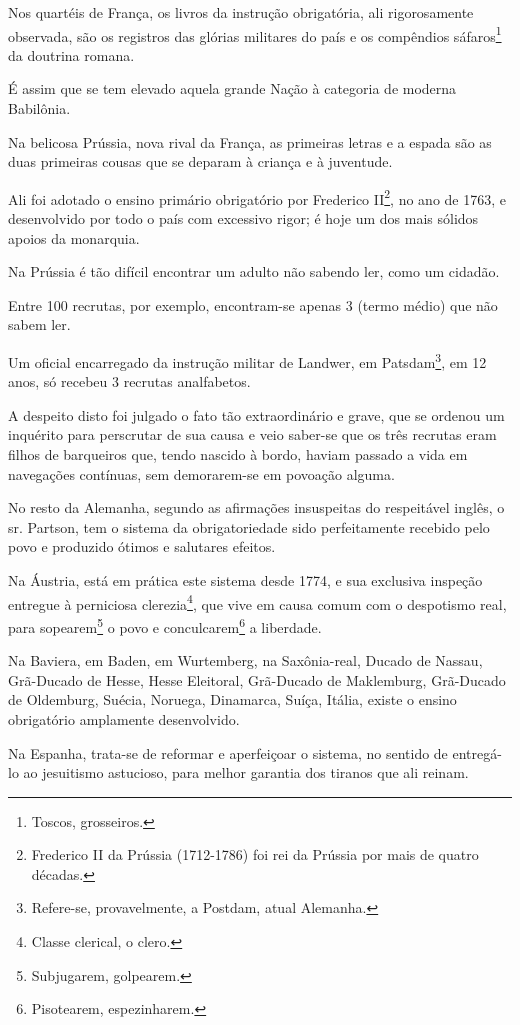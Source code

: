 Nos quartéis de França, os livros da instrução obrigatória, ali
rigorosamente observada, são os registros das glórias militares do país
e os compêndios sáfaros\footnote{Toscos, grosseiros.} da doutrina
romana.

É assim que se tem elevado aquela grande Nação à categoria de moderna
Babilônia.

Na belicosa Prússia, nova rival da França, as primeiras letras e a
espada são as duas primeiras cousas que se deparam à criança e à
juventude.

Ali foi adotado o ensino primário obrigatório por Frederico
II\footnote{Frederico II da Prússia (1712-1786) foi rei da Prússia por
  mais de quatro décadas.}, no ano de 1763, e desenvolvido por todo o
país com excessivo rigor; é hoje um dos mais sólidos apoios da
monarquia.

Na Prússia é tão difícil encontrar um adulto não sabendo ler, como um
cidadão.

Entre 100 recrutas, por exemplo, encontram-se apenas 3 (termo médio) que
não sabem ler.

Um oficial encarregado da instrução militar de Landwer, em
Patsdam\footnote{Refere-se, provavelmente, a Postdam, atual Alemanha.},
em 12 anos, só recebeu 3 recrutas analfabetos.

A despeito disto foi julgado o fato tão extraordinário e grave, que se
ordenou um inquérito para perscrutar de sua causa e veio saber-se que os
três recrutas eram filhos de barqueiros que, tendo nascido à bordo,
haviam passado a vida em navegações contínuas, sem demorarem-se em
povoação alguma.

No resto da Alemanha, segundo as afirmações insuspeitas do respeitável
inglês, o sr. Partson, tem o sistema da obrigatoriedade sido
perfeitamente recebido pelo povo e produzido ótimos e salutares efeitos.

Na Áustria, está em prática este sistema desde 1774, e sua exclusiva
inspeção entregue à perniciosa clerezia\footnote{Classe clerical, o
  clero.}, que vive em causa comum com o despotismo real, para
sopearem\footnote{Subjugarem, golpearem.} o povo e
conculcarem\footnote{Pisotearem, espezinharem.} a liberdade.

Na Baviera, em Baden, em Wurtemberg, na Saxônia-real, Ducado de Nassau,
Grã-Ducado de Hesse, Hesse Eleitoral, Grã-Ducado de Maklemburg,
Grã-Ducado de Oldemburg, Suécia, Noruega, Dinamarca, Suíça, Itália,
existe o ensino obrigatório amplamente desenvolvido.

Na Espanha, trata-se de reformar e aperfeiçoar o sistema, no sentido de
entregá-lo ao jesuitismo astucioso, para melhor garantia dos tiranos que
ali reinam.


